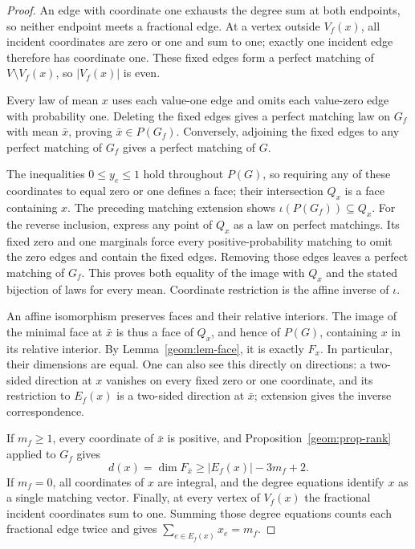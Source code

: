 \begin{proof}
An edge with coordinate one exhausts the degree sum at both
endpoints, so neither endpoint meets a fractional edge. At a vertex
outside \(V_f(x)\), all incident coordinates are zero or one and
sum to one; exactly one incident edge therefore has coordinate one.
These fixed edges form a perfect matching of \(V\setminus V_f(x)\),
so \(|V_f(x)|\) is even.

Every law of mean \(x\) uses each value-one edge and omits each
value-zero edge with probability one. Deleting the fixed edges gives
a perfect matching law on \(G_f\) with mean \(\bar x\), proving
\(\bar x\in P(G_f)\). Conversely, adjoining the fixed edges to any
perfect matching of \(G_f\) gives a perfect matching of \(G\).

The inequalities \(0\le y_e\le1\) hold throughout \(P(G)\), so
requiring any of these coordinates to equal zero or one defines a
face; their intersection \(Q_x\) is a face containing \(x\).
The preceding matching extension shows
\(\iota(P(G_f))\subseteq Q_x\). For the reverse inclusion, express
any point of \(Q_x\) as a law on perfect matchings. Its fixed zero
and one marginals force every positive-probability matching to omit
the zero edges and contain the fixed edges. Removing those edges
leaves a perfect matching of \(G_f\). This proves both equality of
the image with \(Q_x\) and the stated bijection of laws for every
mean. Coordinate restriction is the affine inverse of \(\iota\).

An affine isomorphism preserves faces and their relative interiors.
The image of the minimal face at \(\bar x\) is thus a face of
\(Q_x\), and hence of \(P(G)\), containing \(x\) in its relative
interior. By Lemma~\ref{geom:lem-face}, it is exactly \(F_x\).
In particular, their dimensions are equal. One can also see this
directly on directions: a two-sided direction at \(x\) vanishes on
every fixed zero or one coordinate, and its restriction to
\(E_f(x)\) is a two-sided direction at \(\bar x\); extension gives
the inverse correspondence.

If \(m_f\ge1\), every coordinate of \(\bar x\) is positive, and
Proposition~\ref{geom:prop-rank} applied to \(G_f\) gives
\[
 d(x)=\dim F_{\bar x}\ge |E_f(x)|-3m_f+2.
\]
If \(m_f=0\), all coordinates of \(x\) are integral, and the
degree equations identify \(x\) as a single matching vector.
Finally, at every vertex of \(V_f(x)\) the fractional incident
coordinates sum to one. Summing those degree equations counts each
fractional edge twice and gives
\(\sum_{e\in E_f(x)}x_e=m_f\).
\end{proof}
